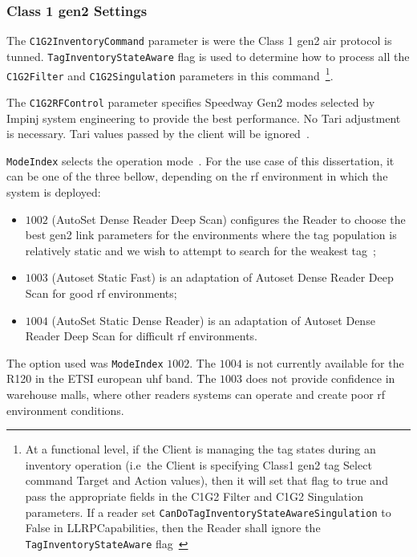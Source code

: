 \subsubsection{Class 1 \ac{gen2} Settings}

The \texttt{C1G2InventoryCommand} parameter is were the Class 1 \ac{gen2} air protocol is tunned.
\texttt{TagInventoryStateAware} flag is used to determine how to process all the \texttt{C1G2Filter} and \texttt{C1G2Singulation} parameters in this command~\footnote{At a functional level, if the Client is managing the tag states during an inventory operation (i.e\ the Client is specifying Class1 \ac{gen2} tag Select command Target and Action values), then it will set that flag to true and pass the appropriate fields in the C1G2 Filter and C1G2 Singulation parameters. If a reader set \texttt{CanDoTagInventoryStateAwareSingulation} to False in LLRPCapabilities, then the Reader shall ignore the \texttt{TagInventoryStateAware} flag~\cite{LowLevelReader}}.

The \texttt{C1G2RFControl} parameter specifies Speedway Gen2 modes selected by Impinj system engineering to provide the best performance. No Tari adjustment is necessary. Tari values passed by the client will be ignored~\cite{ImpinjOctaneLLRP}.

\texttt{ModeIndex} selects the operation mode~\cite{ReaderModesMade, ImpinjOctaneLLRP}. For the use case of this dissertation, it can be one of the three bellow, depending on the \ac{rf} environment in which the system is deployed: 

\begin{itemize}
    \item $1002$ (AutoSet Dense Reader Deep Scan) configures the Reader to choose the best \ac{gen2} link parameters for the environments where the tag population is relatively static and we wish to attempt to search for the weakest tag~\cite{ReaderMode1002};
    \item $1003$ (Autoset Static Fast) is an adaptation of Autoset Dense Reader Deep Scan for good \ac{rf} environments;
    \item $1004$ (AutoSet Static Dense Reader) is an adaptation of Autoset Dense Reader Deep Scan for difficult \ac{rf} environments.
\end{itemize}

The option used was \texttt{ModeIndex} $1002$. The $1004$ is not currently available for the R120 in the ETSI european \ac{uhf} band. The $1003$ does not provide confidence in warehouse malls, where other readers systems can operate and create poor \ac{rf} environment conditions.

